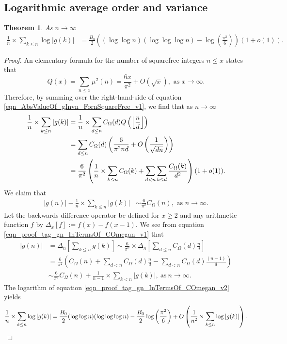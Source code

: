 \documentclass[11pt,reqno,a4letter]{article}
\numberwithin{equation}{section}
\numberwithin{figure}{section}
\numberwithin{table}{section}
\newcommand{\seqnum}[1]{\href{http://oeis.org/#1}{\color{ProcessBlue}{\underline{#1}}}}
\newcommand{\Floor}[2]{\ensuremath{\left\lfloor \frac{#1}{#2} \right\rfloor}}
\theoremstyle{plain}
\newtheorem{theorem}{Theorem}
\numberwithin{theorem}{section}
\theoremstyle{definition}
\begin{document}
\subsection{Logarithmic average order and variance} 

\begin{theorem} 
\label{cor_ExpectationFormulaAbsgInvn_v2} 
As $n \rightarrow \infty$ 
\begin{align*} 
\frac{1}{n} \times \sum_{k \leq n} \log |g(k)| & = 
	\frac{B_0}{2} \left((\log\log n)(\log\log\log n) - 
	\log\left(\frac{\pi^2}{6}\right)\right)(1 + o(1)). 
\end{align*} 
\end{theorem} 
\begin{proof}
An elementary formula for the number of squarefree integers $n \leq x$ states that 
\cite[\S 18.6]{HARDYWRIGHT} \cite[\seqnum{A013928}]{OEIS} 
\[ 
Q(x) = \sum_{n \leq x} \mu^2(n) = \frac{6x}{\pi^2} + O\left(\sqrt{x}\right), 
     \text{\ as $x \rightarrow \infty$}. 
\]
Therefore, by summing over the right-hand-side of equation 
\eqref{eqn_AbsValueOf_gInvn_FornSquareFree_v1}, we find that as $n \rightarrow \infty$   
\begin{align} 
\notag 
\frac{1}{n} \times \sum_{k \leq n} |g(k)| & = \frac{1}{n} \times \sum_{d \leq n} 
     C_{\Omega}(d) Q\left(\Floor{n}{d}\right) \\ 
\notag 
     & = \sum_{d \leq n} C_{\Omega}(d) \left(\frac{6}{\pi^2 nd} + O\left(\frac{1}{\sqrt{dn}}\right) 
     \right) \\ 
\label{eqn_proof_tag_gn_InTermsOf_COmegan_v1}
     & = \frac{6}{\pi^2} \left(\frac{1}{n} \times \sum_{k \leq n} C_{\Omega}(k) + \sum_{d<n} 
     \sum_{k \leq d} \frac{C_{\Omega}(k)}{d^2}\right)(1 + o(1)). 
\end{align} 
We claim that 
\begin{align}
\label{eqn_proof_tag_gn_InTermsOf_COmegan_v2}
|g(n)| - \frac{1}{n} \times \sum_{k \leq n} |g(k)| & \sim \frac{6}{\pi^2} C_{\Omega}(n), 
     \text{\ as\ } n \rightarrow \infty. 
\end{align} 
Let the backwards difference operator 
be defined for $x \geq 2$ and any arithmetic function $f$ by 
$\Delta_x[f] := f(x) - f(x-1)$. 
We see from equation \eqref{eqn_proof_tag_gn_InTermsOf_COmegan_v1} that 
\begin{align*} 
     |g(n)| & = \Delta_n\left[\sum_{k \leq n} g(k)\right]  
     \sim \frac{6}{\pi^2} \times 
     \Delta_n\left[\sum_{d \leq n} C_{\Omega}(d) \frac{n}{d}\right] \\ 
     & = \frac{6}{\pi^2}\left(C_{\Omega}(n) + \sum_{d < n} C_{\Omega}(d) \frac{n}{d} - 
     \sum_{d<n} C_{\Omega}(d) \frac{(n-1)}{d}\right) \\ 
     & \sim \frac{6}{\pi^2} C_{\Omega}(n) + \frac{1}{n-1} \times \sum_{k < n} |g(k)|, 
     \mathrm{\ as\ } n \rightarrow \infty. 
\end{align*} 
The logarithm of equation \eqref{eqn_proof_tag_gn_InTermsOf_COmegan_v2} yields
\[
\frac{1}{n} \times \sum_{k \leq n} \log |g(k)| = 
     \frac{B_0}{2} (\log\log n) (\log\log\log n) - 
     \frac{B_0}{2}\log\left(\frac{\pi^2}{6}\right) + 
     O\left(\frac{1}{n^2} \times \sum_{k \leq n} \log |g(k)|\right). 
     \qedhere
\]
\end{proof} 
\end{document}
